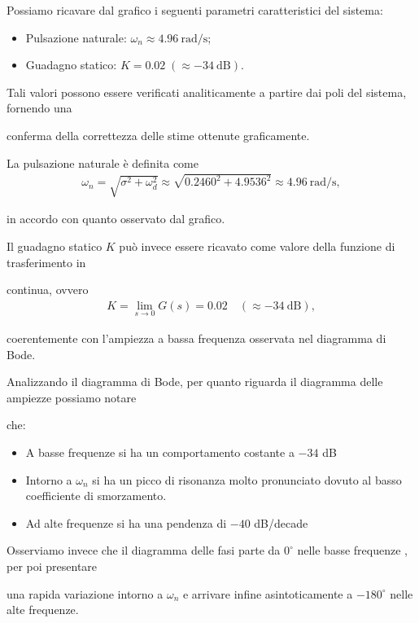 \documentclass[a4paper, 11pt]{article}
\begin{document}
\label{sec:diagramma delle ampiezze}

Possiamo ricavare dal grafico i seguenti parametri caratteristici del sistema:
\begin{itemize}
    \item Pulsazione naturale: $\omega_n \approx 4.96 \ \text{rad/s}$;
    \item Guadagno statico: $K = 0.02 \; (\approx -34 \ \text{dB})$.
\end{itemize}

Tali valori possono essere verificati analiticamente a partire dai poli del sistema, fornendo una 

conferma della correttezza delle stime ottenute graficamente.

La pulsazione naturale è definita come
\begin{align}
\omega_n = \sqrt{\sigma^2 + \omega_d^2} \approx \sqrt{0.2460^2 + 4.9536^2} \approx 4.96 \ \text{rad/s},
\end{align}

in accordo con quanto osservato dal grafico.

Il guadagno statico \(K\) può invece essere ricavato come valore della funzione di trasferimento in 

continua, ovvero
\begin{align}
K = \lim_{s \to 0} G(s) = 0.02 \quad (\approx -34 \ \text{dB}),
\end{align}

coerentemente con l’ampiezza a bassa frequenza osservata nel diagramma di Bode.

Analizzando il diagramma di Bode, per quanto riguarda il diagramma delle ampiezze possiamo notare 

che:
\begin{itemize}
    \item A basse frequenze si ha un comportamento costante a $-34$ dB
    \item Intorno a $\omega_n$ si ha un picco di risonanza molto pronunciato dovuto al basso coefficiente di smorzamento. 
    \item Ad alte frequenze si ha una pendenza di $-40$ dB/decade 
\end{itemize}

Osserviamo invece che il diagramma delle fasi parte da $0^\circ$ nelle basse frequenze , per poi presentare 

una rapida variazione intorno a $\omega_n$ e arrivare infine asintoticamente a $-180^\circ$ nelle alte frequenze.
\end{document}
